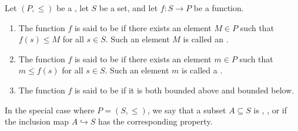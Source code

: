 \begin{definition} \label{definition:bounded_above_below_and_bounded_function_on_a_set_to_an_ordered_set}
    Let $(P,\leq)$ be a , let $S$ be a set, and let $f : S \to P$ be a function.

    \begin{enumerate}
        \item The function $f$ is said to be  if there exists an element $M \in P$ such that $f(s) \leq M$ for all $s \in S$. Such an element $M$ is called an .

        \item The function $f$ is said to be  if there exists an element $m \in P$ such that $m \leq f(s)$ for all $s \in S$. Such an element $m$ is called a .

        \item The function $f$ is said to be  if it is both bounded above and bounded below.
    \end{enumerate}

    In the special case where $P = (S,\leq)$, we say that a subset $A \subseteq S$ is , , or  if the inclusion map $A \hookrightarrow S$ has the corresponding property.
\end{definition}
